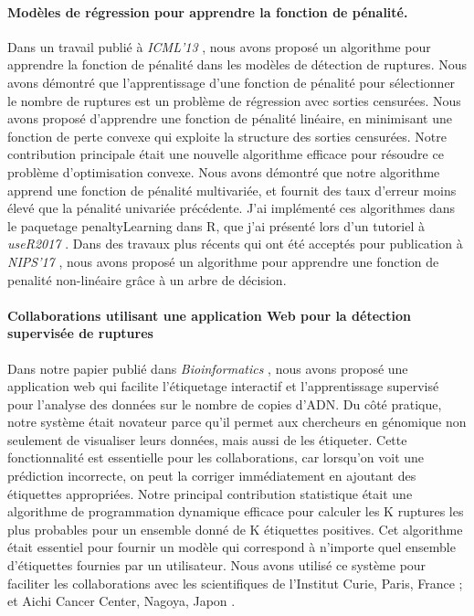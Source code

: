 \documentclass{article}
\begin{document}
\paragraph{Modèles de régression pour apprendre la fonction de pénalité.}

Dans un travail publié à \emph{ICML'13} \citep{HOCKING-penalties},
nous avons proposé un algorithme pour apprendre la fonction de
pénalité dans les modèles de détection de ruptures. Nous avons
démontré que l'apprentissage d'une fonction de pénalité pour
sélectionner le nombre de ruptures est un problème de régression avec
sorties censurées. Nous avons proposé d'apprendre une fonction de
pénalité linéaire, en minimisant une fonction de perte convexe qui
exploite la structure des sorties censurées. Notre contribution
principale était une nouvelle algorithme efficace pour résoudre ce
problème d'optimisation convexe. Nous avons démontré que notre
algorithme apprend une fonction de pénalité multivariée, et fournit
des taux d'erreur moins élevé que la pénalité univariée
précédente. J'ai implémenté ces algorithmes dans le paquetage
penaltyLearning dans R, que j'ai présenté lors d'un tutoriel à
\emph{useR2017} \citep{change-tutorial}. Dans des travaux plus récents
qui ont été acceptés pour publication à \emph{NIPS'17} \citep{MMIT},
nous avons proposé un algorithme pour apprendre une fonction de
penalité non-linéaire grâce à un arbre de décision.

\paragraph{Collaborations utilisant une application Web pour la
  détection supervisée de ruptures} Dans notre papier publié dans
\emph{Bioinformatics} \citep{hocking-SegAnnDB}, nous avons proposé une
application web qui facilite l'étiquetage interactif et
l'apprentissage supervisé pour l'analyse des données sur le nombre de
copies d'ADN. Du côté pratique, notre système était novateur parce
qu'il permet aux chercheurs en génomique non seulement de visualiser
leurs données, mais aussi de les étiqueter. Cette fonctionnalité est
essentielle pour les collaborations, car lorsqu'on voit une prédiction
incorrecte, on peut la corriger immédiatement en ajoutant des
étiquettes appropriées. Notre principal contribution statistique était
une algorithme de programmation dynamique efficace pour calculer les K
ruptures les plus probables pour un ensemble donné de K étiquettes
positives. Cet algorithme était essentiel pour fournir un modèle qui
correspond à n'importe quel ensemble d'étiquettes fournies par un
utilisateur. Nous avons utilisé ce système pour faciliter les
collaborations avec les scientifiques de l'Institut Curie, Paris,
France \citep{Chicard}; et Aichi Cancer Center, Nagoya, Japon
\citep{Hocking-Leukemia-2016,m14:clonal}.
\end{document}
